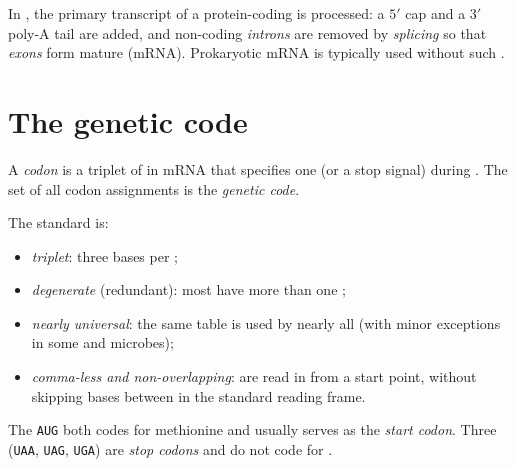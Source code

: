\begin{remark}
In , the primary transcript of a protein-coding  is processed:
a $5'$ cap and a $3'$ poly-A tail are added, and non-coding
\emph{introns} are removed by \emph{splicing} so
that \emph{exons} form mature \emph{}
(mRNA). Prokaryotic mRNA is typically used
without such .
\end{remark}

\section{The genetic code}

\begin{definition}[Codon]\label{def:g11:gene-expression:codon}
A \emph{codon} is a triplet of  in mRNA that specifies
one  (or a stop signal) during . The set of all codon
assignments is the \emph{genetic code}.
\end{definition}

\begin{proposition}\label{prop:g11:gene-expression:code-props}
The standard  is:
\begin{itemize}
  \item \emph{triplet}: three bases per ;
  \item \emph{degenerate} (redundant): most  have more than one ;
  \item \emph{nearly universal}: the same  table is used by nearly all
         (with minor exceptions in some  and microbes);
  \item \emph{comma-less and non-overlapping}:  are read in  from a
        start point, without skipping bases between  in the standard
        reading frame.
\end{itemize}
The  \texttt{AUG} both codes for methionine and usually serves as the
\emph{start codon}. Three  (\texttt{UAA}, \texttt{UAG},
\texttt{UGA}) are \emph{stop codons} and do not code for .
\end{proposition}
\admitted

